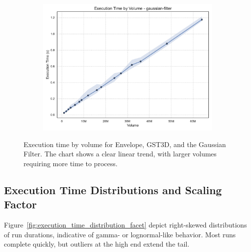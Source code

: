 \begin{figure}[htbp]
\begin{subfigure}[t]{0.49\textwidth}
        \includegraphics[width=\textwidth]{assets/images/05/execution_time_by_volume_gaussian-filter}
    \end{subfigure}
    \caption{Execution time by volume for Envelope, \ac{GST3D}, and the Gaussian Filter.
    The chart shows a clear linear trend, with larger volumes requiring more time to process.}
    \label{fig:execution_time_by_volume_facet}
\end{figure}

\subsection{Execution Time Distributions and Scaling Factor}
\label{subsec:execution-time-distributions-and-scaling}

Figure~\ref{fig:execution_time_distribution_facet} depict right-skewed distributions of run durations, indicative of gamma- or lognormal-like behavior.
Most runs complete quickly, but outliers at the high end extend the tail.

